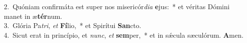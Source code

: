 {2.~}Quóniam confirmáta est super nos misericór\textit{di}\textit{a} \textbf{e}jus:~* et véritas Dómini manet in æ\textbf{tér}num.\\
{3.~}Glória Pa\textit{tri}, \textit{et} \textbf{Fí}lio,~* et Spirítui \textbf{San}cto.\\
{4.~}Sicut erat in princípio, et \textit{nunc}, \textit{et} \textbf{sem}per,~* et in sǽcula sæculórum. \textbf{A}men.\\
